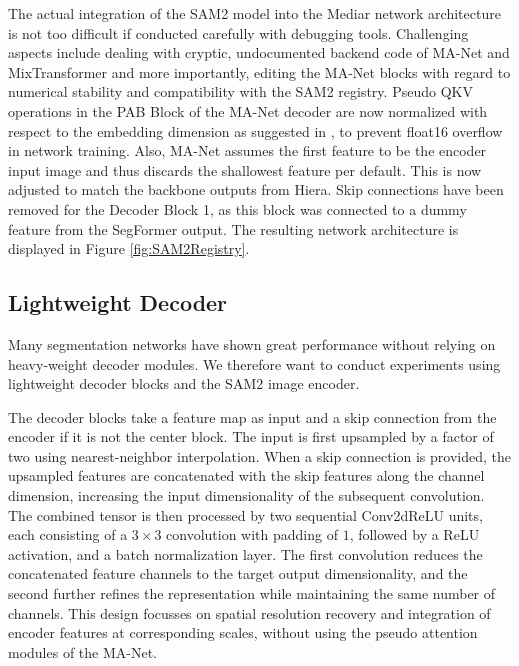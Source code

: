 The actual integration of the SAM2 model into the Mediar network architecture is not too difficult if conducted carefully with debugging tools. Challenging aspects include dealing with cryptic, undocumented backend code of MA-Net and MixTransformer and more importantly, editing the MA-Net blocks with regard to numerical stability and compatibility with the SAM2 registry. Pseudo QKV operations in the PAB Block of the MA-Net decoder are now normalized with respect to the embedding dimension as suggested in \cite{vaswani2023attentionneed}, to prevent float16 overflow in network training. Also, MA-Net assumes the first feature to be the encoder input image and thus discards the shallowest feature per default. This is now adjusted to match the backbone outputs from Hiera. Skip connections have been removed for the Decoder Block 1, as this block was connected to a dummy feature from the SegFormer output. The resulting network architecture is displayed in Figure \ref{fig:SAM2Registry}.

\subsection{Lightweight Decoder}

Many segmentation networks \cite{xie2021segformersimpleefficientdesign, Stringer.2020, bui2024sam3dsegmentmodelvolumetric} have shown great performance without relying on heavy-weight decoder modules. We therefore want to conduct experiments using lightweight decoder blocks and the SAM2 image encoder. 

The decoder blocks take a feature map as input and a skip connection from the encoder if it is not the center block. The input is first upsampled by a factor of two using nearest-neighbor interpolation. When a skip connection is provided, the upsampled features are concatenated with the skip features along the channel dimension, increasing the input dimensionality of the subsequent convolution. The combined tensor is then processed by two sequential Conv2dReLU units, each consisting of a $3 \times 3$ convolution with padding of $1$, followed by a ReLU activation, and a batch normalization layer. The first convolution reduces the concatenated feature channels to the target output dimensionality, and the second further refines the representation while maintaining the same number of channels. This design focusses on spatial resolution recovery and integration of encoder features at corresponding scales, without using the pseudo attention modules of the MA-Net. 




